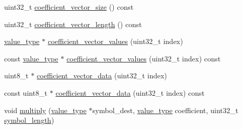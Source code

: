 \begin{DoxyCompactItemize}
uint32\-\_\-t \hyperlink{classkodo_1_1proxy__layer_a4e0f19a0ff838c8d78c2a10b5322de2b}{coefficient\-\_\-vector\-\_\-size} () const 
\begin{DoxyCompactList}\small\item\em \end{DoxyCompactList}\item 
uint32\-\_\-t \hyperlink{classkodo_1_1proxy__layer_a6fff65f4d2573a26153eb37da5dd6af7}{coefficient\-\_\-vector\-\_\-length} () const 
\begin{DoxyCompactList}\small\item\em \end{DoxyCompactList}\item 
\hyperlink{classkodo_1_1proxy__layer_a1e9ff5aada4a2ab5dc0ce4e7df39160a}{value\-\_\-type} $\ast$ \hyperlink{classkodo_1_1proxy__layer_a82071c8ee9ac3d09875e358d04920c7a}{coefficient\-\_\-vector\-\_\-values} (uint32\-\_\-t index)
\begin{DoxyCompactList}\small\item\em \end{DoxyCompactList}\item 
const \hyperlink{classkodo_1_1proxy__layer_a1e9ff5aada4a2ab5dc0ce4e7df39160a}{value\-\_\-type} $\ast$ \hyperlink{classkodo_1_1proxy__layer_a576459f102aaa62aefedfdab5caa9c33}{coefficient\-\_\-vector\-\_\-values} (uint32\-\_\-t index) const 
\begin{DoxyCompactList}\small\item\em \end{DoxyCompactList}\item 
uint8\-\_\-t $\ast$ \hyperlink{classkodo_1_1proxy__layer_ae74c00f9856fe1d6e3d89d6f1b818223}{coefficient\-\_\-vector\-\_\-data} (uint32\-\_\-t index)
\begin{DoxyCompactList}\small\item\em \end{DoxyCompactList}\item 
const uint8\-\_\-t $\ast$ \hyperlink{classkodo_1_1proxy__layer_a6aa066a74e316faf1791eefda7d1a5dd}{coefficient\-\_\-vector\-\_\-data} (uint32\-\_\-t index) const 
\begin{DoxyCompactList}\small\item\em \end{DoxyCompactList}\item 
void \hyperlink{classkodo_1_1proxy__layer_aac50560d78370384f33ce6276efe9b3c}{multiply} (\hyperlink{classkodo_1_1proxy__layer_a1e9ff5aada4a2ab5dc0ce4e7df39160a}{value\-\_\-type} $\ast$symbol\-\_\-dest, \hyperlink{classkodo_1_1proxy__layer_a1e9ff5aada4a2ab5dc0ce4e7df39160a}{value\-\_\-type} coefficient, uint32\-\_\-t \hyperlink{classkodo_1_1proxy__layer_a87583efe23d937a2cb3426bde4566ebc}{symbol\-\_\-length})

\end{DoxyCompactItemize}
